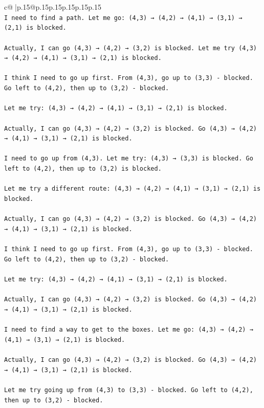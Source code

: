 \documentclass{article}
\begin{document}
{\begin{supertabular}{c@{$\;$}|p{.15\linewidth}@{}p{.15\linewidth}p{.15\linewidth}p{.15\linewidth}p{.15\linewidth}p{.15\linewidth}}
{{{\\ 
\texttt{I need to find a path. Let me go: (4,3) → (4,2) → (4,1) → (3,1) → (2,1) is blocked. } \\
\\ 
\texttt{Actually, I can go (4,3) → (4,2) → (3,2) is blocked. Let me try (4,3) → (4,2) → (4,1) → (3,1) → (2,1) is blocked.} \\
\\ 
\texttt{I think I need to go up first. From (4,3), go up to (3,3) {-} blocked. Go left to (4,2), then up to (3,2) {-} blocked. } \\
\\ 
\texttt{Let me try: (4,3) → (4,2) → (4,1) → (3,1) → (2,1) is blocked. } \\
\\ 
\texttt{Actually, I can go (4,3) → (4,2) → (3,2) is blocked. Go (4,3) → (4,2) → (4,1) → (3,1) → (2,1) is blocked.} \\
\\ 
\texttt{I need to go up from (4,3). Let me try: (4,3) → (3,3) is blocked. Go left to (4,2), then up to (3,2) is blocked. } \\
\\ 
\texttt{Let me try a different route: (4,3) → (4,2) → (4,1) → (3,1) → (2,1) is blocked. } \\
\\ 
\texttt{Actually, I can go (4,3) → (4,2) → (3,2) is blocked. Go (4,3) → (4,2) → (4,1) → (3,1) → (2,1) is blocked.} \\
\\ 
\texttt{I think I need to go up first. From (4,3), go up to (3,3) {-} blocked. Go left to (4,2), then up to (3,2) {-} blocked. } \\
\\ 
\texttt{Let me try: (4,3) → (4,2) → (4,1) → (3,1) → (2,1) is blocked. } \\
\\ 
\texttt{Actually, I can go (4,3) → (4,2) → (3,2) is blocked. Go (4,3) → (4,2) → (4,1) → (3,1) → (2,1) is blocked.} \\
\\ 
\texttt{I need to find a way to get to the boxes. Let me go: (4,3) → (4,2) → (4,1) → (3,1) → (2,1) is blocked. } \\
\\ 
\texttt{Actually, I can go (4,3) → (4,2) → (3,2) is blocked. Go (4,3) → (4,2) → (4,1) → (3,1) → (2,1) is blocked.} \\
\\ 
\texttt{Let me try going up from (4,3) to (3,3) {-} blocked. Go left to (4,2), then up to (3,2) {-} blocked. } \\
}}}
\end{supertabular}}
\end{document}
